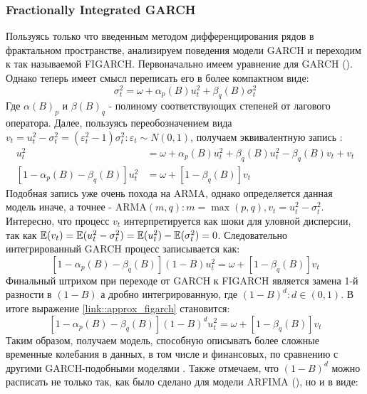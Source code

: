 \subsubsection{Fractionally Integrated GARCH} \label{link::figarch}
Пользуясь только что введенным методом дифференцирования рядов в фрактальном пространстве, анализируем поведения модели GARCH и переходим к так называемой FIGARCH. Первоначально имеем уравнение для GARCH (). Однако теперь имеет смысл переписать его в более компактном виде:
\begin{equation}
	\sigma^2_t = \omega + \alpha_p(B)u^2_t + \beta_q(B)\sigma^2_t
\end{equation}
Где $\alpha(B)_p$ и $\beta(B)_q$ - полиному соответствующих степеней от лагового оператора. Далее, пользуясь переобозначением вида $v_t = u_t^2 - \sigma^2_t = (\varepsilon^2_{t} - 1)\sigma^2_t: \varepsilon_{t} \sim N(0, 1)$, получаем эквивалентную запись \cite{tayefi2012overview}:
\begin{equation}
	\begin{split}
		u_t^2 & = \omega + \alpha_p(B)u_t^2 + \beta_q(B)u_t^2 - \beta_q(B)v_t + v_t\\
		\left[1 - \alpha_p(B) - \beta_q(B)\right] u_t^2 & = \omega + \left[1 - \beta_q(B)\right]v_t
	\end{split}
\end{equation}
Подобная запись уже очень похода на ARMA, однако определяется данная модель иначе, а точнее - ARMA$(m, q): m = \max(p, q), v_t = u_t^2 - \sigma^2_t$. Интересно, что процесс $v_t$ интерпретируется как шоки для уловной дисперсии, так как $\mathbb{E}(v_t) = \mathbb{E}(u_t^2 - \sigma^2_t) = \mathbb{E}(u_t^2) - \mathbb{E}(\sigma^2_t) = 0$. Следовательно интегрированный GARCH процесс записывается как:
\begin{equation} \label{link::approx_figarch}
	\left[1 - \alpha_p(B) - \beta_q(B)\right] (1 - B) u_t^2 = \omega + \left[1 - \beta_q(B)\right]v_t
\end{equation}
Финальный штрихом при переходе от GARCH к FIGARCH является замена 1-й разности в $(1 - B)$ а дробно интегрированную, где $(1 - B)^d: d \in (0, 1)$. В итоге выражение \ref{link::approx_figarch} становится:
\begin{equation} \label{link::approx_figarch}
	\left[1 - \alpha_p(B) - \beta_q(B)\right] (1 - B)^d u_t^2 = \omega + \left[1 - \beta_q(B)\right]v_t
\end{equation}
Таким образом, получаем модель, способную описывать более сложные временные колебания в данных, в том числе и финансовых, по сравнению с другими GARCH-подобными моделями \cite{davidson2004moment}. Также отмечаем, что $(1 - B)^d$ можно расписать не только так, как было сделано для модели ARFIMA (), но и в виде:
